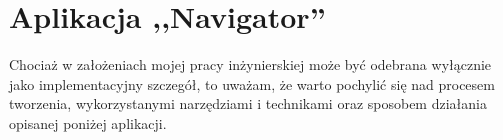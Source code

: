 \section{Aplikacja ,,Navigator''} \label{NavigatorAppSection}

Chociaż w założeniach mojej pracy inżynierskiej może być odebrana wyłącznie jako implementacyjny szczegół, 
to uważam, że warto pochylić się nad procesem tworzenia, wykorzystanymi narzędziami i technikami
oraz sposobem działania opisanej poniżej aplikacji.



\newpage



\newpage

